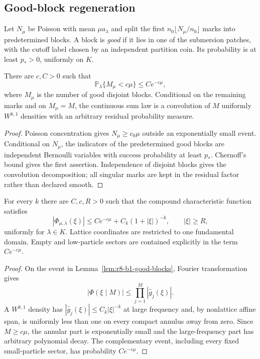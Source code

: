 \subsection{Good-block regeneration}

Let $N_\mu$ be Poisson with mean $\mu a_\lambda$ and split the first
$n_0\lfloor N_\mu/n_0\rfloor$ marks into predetermined blocks.  A block is
\emph{good} if it lies in one of the submersion patches, with the cutoff label
chosen by an independent partition coin.  Its probability is at least
$p_*>0$, uniformly on $K$.

\begin{lemma}
\label{lem:r8-b1-good-blocks}
There are $c,C>0$ such that
\[
 \mathbb P_\lambda\{M_\mu<c\mu\}\le Ce^{-c\mu},
\]
where $M_\mu$ is the number of good disjoint blocks.  Conditional on the
remaining marks and on $M_\mu=M$, the continuous sum law is a convolution of
$M$ uniformly $W^{k,1}$ densities with an arbitrary residual probability
measure.
\end{lemma}

\begin{proof}
Poisson concentration gives $N_\mu\ge c_0\mu$ outside an exponentially small
event.  Conditional on $N_\mu$, the indicators of the predetermined good
blocks are independent Bernoulli variables with success probability at least
$p_*$.  Chernoff's bound gives the first assertion.  Independence of disjoint
blocks gives the convolution decomposition; all singular marks are kept in the
residual factor rather than declared smooth.
\end{proof}

\begin{theorem}
\label{thm:r8-b1-characteristic}
For every $k$ there are $C,c,R>0$ such that the compound characteristic
function satisfies
\[
 |\Phi_{\mu,\lambda}(\xi)|
 \le Ce^{-c\mu}+C_k(1+|\xi|)^{-k},
 \qquad |\xi|\ge R,
\]
uniformly for $\lambda\in K$.  Lattice coordinates are restricted to one
fundamental domain.  Empty and low-particle sectors are contained explicitly
in the term $Ce^{-c\mu}$.
\end{theorem}

\begin{proof}
On the event in Lemma~\ref{lem:r8-b1-good-blocks}, Fourier transformation gives
\[
 |\Phi(\xi\mid M)|\le \prod_{j=1}^{M}|\widehat g_j(\xi)|.
\]
A $W^{k,1}$ density has $|\widehat g_j(\xi)|\le C_k|\xi|^{-k}$ at large
frequency and, by nonlattice affine span, is uniformly less than one on every
compact annulus away from zero.  Since $M\ge c\mu$, the annular part is
exponentially small and the large-frequency part has arbitrary polynomial
decay.  The complementary event, including every fixed small-particle sector,
has probability $Ce^{-c\mu}$.
\end{proof}

